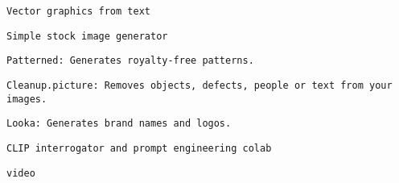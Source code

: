         
         
          \protect\hypertarget{ID_42908688}{}{}

\begin{verbatim}
Vector graphics from text
\end{verbatim}
         

         
         
          \protect\hypertarget{ID_1503543281}{}{}

\begin{verbatim}
Simple stock image generator
\end{verbatim}
         

         
         
          \protect\hypertarget{ID_662691490}{}{}

\begin{verbatim}
Patterned: Generates royalty-free patterns.
\end{verbatim}
         

         
         
          \protect\hypertarget{ID_1501363905}{}{}

\begin{verbatim}
Cleanup.picture: Removes objects, defects, people or text from your images.
\end{verbatim}
         

         
         
          \protect\hypertarget{ID_1575236714}{}{}

\begin{verbatim}
Looka: Generates brand names and logos.
\end{verbatim}
         

         
         
          \protect\hypertarget{ID_380962755}{}{}

\begin{verbatim}
CLIP interrogator and prompt engineering colab
\end{verbatim}
         
       

       
       
        \protect\hypertarget{ID_725587435}{}{}

\begin{verbatim}
video
\end{verbatim}

         
         
          \protect\hypertarget{ID_1363822516}{}{}

